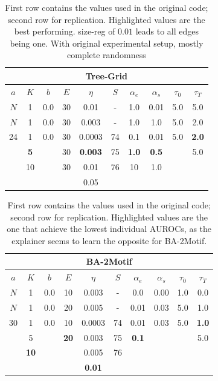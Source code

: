 \begin{table}[h]
  \centering
  \scriptsize
  \begin{tabular}{|c|c|c|c|c|c|c|c|c|c|}
  \hline
  \multicolumn{10}{|c|}{\textbf{Tree-Grid}} \\ \hline
  $a$ & $K$ & $b$ & $E$ & $\eta$ & $S$ & $\alpha_e$ & $\alpha_s$ & $\tau_0$ & $\tau_T$ \\ \hline
  $N$ & 1 & 0.0 & 30 & 0.01 & - & 1.0 & 0.01 & 5.0 & 5.0 \\ \hline
  $N$ & 1 & 0.0 & 30 & 0.003 & - & 1.0 & 1.0 & 5.0 & 2.0 \\ \midrule
  24 & 1 & 0.0 & 30 & 0.0003 & 74 & 0.1 & 0.01 & 5.0 & \textbf{2.0} \\
   & \textbf{5} &  & 30 & \textbf{0.003} & 75 & \textbf{1.0} & \textbf{0.5} &  & 5.0 \\
   & 10 &  & 30 & 0.01 & 76 & 10 & 1.0 &  &  \\ 
   &  &  &  & 0.05 &  &  &  &  &  \\ \hline
  \end{tabular}
  \caption[Tree-Grid Sweep]{First row contains the values used in the original code; second row for replication. Highlighted values are the best performing. size-reg of $0.01$ leads to all edges being one. With original experimental setup, mostly complete randomness}
\end{table}

\begin{table}[h]
  \centering
  \scriptsize
  \begin{tabular}{|c|c|c|c|c|c|c|c|c|c|}
  \hline
  \multicolumn{10}{|c|}{\textbf{BA-2Motif}} \\ \hline
  $a$ & $K$ & $b$ & $E$ & $\eta$ & $S$ & $\alpha_e$ & $\alpha_s$ & $\tau_0$ & $\tau_T$ \\ \hline
  $N$ & 1 & 0.0 & 10 & 0.003 & - & 0.0 & 0.00 & 1.0 & 0.0 \\ \hline
  $N$ & 1 & 0.0 & 20 & 0.005 & - & 0.01 & 0.03 & 5.0 & 1.0 \\ \midrule
  30 & 1 & 0.0 & 10 & 0.0003 & 74 & 0.01 & 0.03 & 5.0 & \textbf{1.0} \\
   & 5 &  & \textbf{20} & 0.003 & 75 & \textbf{0.1} &  &  & 5.0 \\
   & \textbf{10} &  &  & 0.005 & 76 &  &  &  &  \\
   &  &  &  & \textbf{0.01} &  &  &  &  &  \\ \hline
  \end{tabular}
  \caption[BA-2Motif Sweep]{First row contains the values used in the original code; second row for replication. Highlighted values are the one that achieve the lowest individual AUROCs, as the explainer seems to learn the opposite for BA-2Motif.}
    \label{tab:BA-2Motif_sweep}
\end{table}

